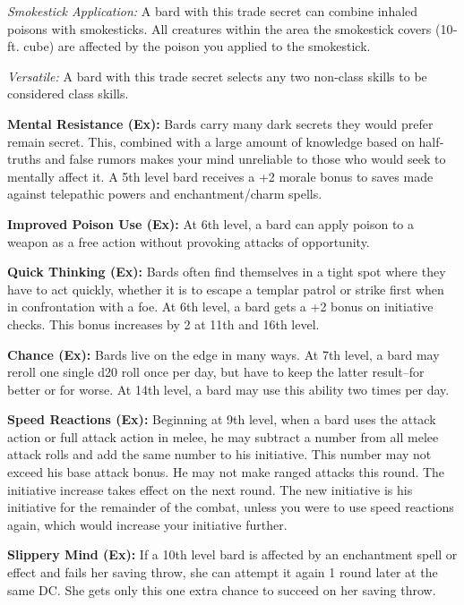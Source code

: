 \textit{Smokestick Application:} A bard with this trade secret can combine inhaled poisons with smokesticks. All creatures within the area the smokestick covers (10‐ft. cube) are affected by the poison you applied to the smokestick.

\textit{Versatile:} A bard with this trade secret selects any two non‐class skills to be considered class skills.

\textbf{Mental Resistance (Ex):} Bards carry many dark secrets they would prefer remain secret. This, combined with a large amount of knowledge based on half‐truths and false rumors makes your mind unreliable to those who would seek to mentally affect it. A 5th level bard receives a +2 morale bonus to saves made against telepathic powers and enchantment/charm spells.

\textbf{Improved Poison Use (Ex):} At 6th level, a bard can apply poison to a weapon as a free action without provoking attacks of opportunity.

\textbf{Quick Thinking (Ex):} Bards often find themselves in a tight spot where they have to act quickly, whether it is to escape a templar patrol or strike first when in confrontation with a foe. At 6th level, a bard gets a +2 bonus on initiative checks. This bonus increases by 2 at 11th and 16th level.

\textbf{Chance (Ex):} Bards live on the edge in many ways. At 7th level, a bard may reroll one single d20 roll once per day, but have to keep the latter result--for better or for worse. At 14th level, a bard may use this ability two times per day.

\textbf{Speed Reactions (Ex):} Beginning at 9th level, when a bard uses the attack action or full attack action in melee, he may subtract a number from all melee attack rolls and add the same number to his initiative. This number may not exceed his base attack bonus. He may not make ranged attacks this round. The initiative increase takes effect on the next round. The new initiative is his initiative for the remainder of the combat, unless you were to use speed reactions again, which would increase your initiative further.

\textbf{Slippery Mind (Ex):} If a 10th level bard is affected by an enchantment spell or effect and fails her saving throw, she can attempt it again 1 round later at the same DC. She gets only this one extra chance to succeed on her saving throw.

